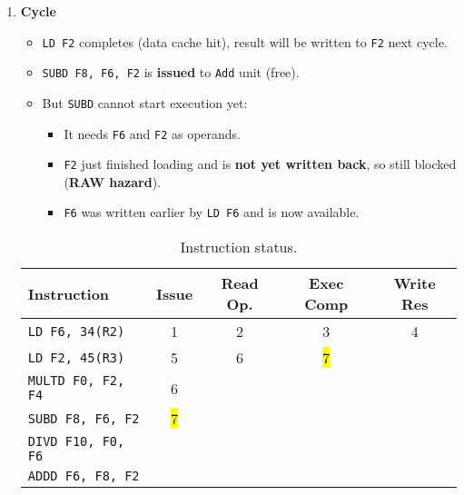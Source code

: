 \begin{enumerate}
    \newpage


    \item \textbf{Cycle \theenumi}
    \begin{itemize}
        \item[\textcolor{Green3}{\faIcon{check}}] \texttt{LD F2} completes (data cache hit), result will be written to \texttt{F2} next cycle.
        \item[\textcolor{Green3}{\faIcon{check}}] \texttt{SUBD F8, F6, F2} is \textbf{issued} to \texttt{Add} unit (free).
        \item[\textcolor{Red2}{\faIcon{times}}] But \texttt{SUBD} cannot start execution yet:
        \begin{itemize}
            \item It needs \texttt{F6} and \texttt{F2} as operands.
            \item \texttt{F2} just finished loading and is \textbf{not yet written back}, so still blocked (\textbf{RAW hazard}).
            \item \texttt{F6} was written earlier by \texttt{LD F6} and is now available.
        \end{itemize}
    \end{itemize}

    \begin{table}[!htp]
        \centering
        \begin{tabular}{@{} l | c c c c @{}}
            \toprule
            Instruction                 & Issue & Read Op.  & Exec Comp & Write Res \\
            \midrule
            \texttt{LD    F6, 34(R2)}   & 1     & 2         & 3         & 4         \\ [.3em]
            \texttt{LD    F2, 45(R3)}   & 5     & 6         & \hl{7}    &           \\ [.3em]
            \texttt{MULTD F0, F2, F4}   & 6     &           &           &           \\ [.3em]
            \texttt{SUBD  F8, F6, F2}   & \hl{7}&           &           &           \\ [.3em]
            \texttt{DIVD  F10, F0, F6}  &       &           &           &           \\ [.3em]
            \texttt{ADDD  F6, F8, F2}   &       &           &           &           \\
            \bottomrule
        \end{tabular}
        \caption*{Instruction status.}
    \end{table}


\end{enumerate}
